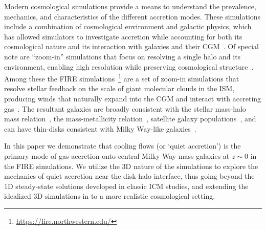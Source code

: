 \documentclass[fleqn,usenatbib]{mnras}
\begin{document}
Modern cosmological simulations provide a means to understand the prevalence, mechanics, and characteristics of the different accretion modes.
These simulations include a combination of cosmological environment and galactic physics, which has allowed simulators to investigate accretion while accounting for both its cosmological nature and its interaction with galaxies and their CGM~\citep[e.g.][]{Oppenheimer2010, Stewart2011, Fernandez2012, Ford2014, Angles-Alcazar2017, Hafen2019, Hafen2020, Ho2019, Rottgers2020, Trapp2021}.
Of special note are ``zoom-in'' simulations that focus on resolving a single halo and its environment, enabling high resolution while preserving cosmological structure~\citep[e.g.][]{Katz1993, Hopkins2014, Hopkins2018, Wang2015, Agertz2020}.
Among these the FIRE simulations~\citep{Hopkins2014, Hopkins2017}\footnote{\url{https://fire.northwestern.edu/}} are a set of zoom-in simulations that resolve stellar feedback on the scale of giant molecular clouds in the ISM, producing winds that naturally expand into the CGM and interact with accreting gas~\citep{Muratov2015, Muratov2017, Hafen2019, Hafen2020}.
The resultant galaxies are broadly consistent with the stellar mass-halo mass relation~\citep{Hopkins2017}, the mass-metallicity relation~\citep{Ma2016a}, satellite galaxy populations~\citep{Wetzel2016, Garrison-Kimmel2019a}, and can have thin-disks consistent with Milky Way-like galaxies~\citep{Garrison-Kimmel2018, El-Badry2018}.

In this paper we demonstrate that cooling flows (or `quiet accretion') is the primary mode of gas accretion onto central Milky Way-mass galaxies at $z \sim 0$ in the FIRE simulations. 
We utilize the 3D nature of the simulations to explore the mechanics of quiet accretion near the disk-halo interface, thus going beyond the 1D steady-state solutions developed in classic ICM studies, and extending the idealized 3D simulations in \cite{Stern2020} to a more realistic cosmological setting. 
\end{document}
